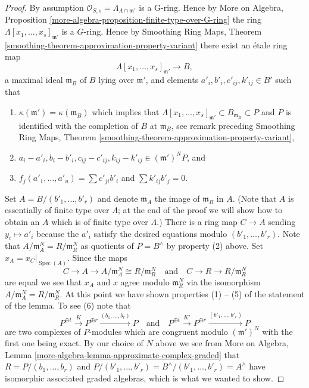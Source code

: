 \documentclass{stacks-project}
\theoremstyle{plain}
\theoremstyle{definition}
\theoremstyle{remark}
\numberwithin{equation}{subsection}
\def\Spec{\mathop{\mathrm{Spec}}}
\begin{document}
\begin{proof}
\medskip\noindent
By assumption $\mathcal{O}_{S, s} = \Lambda_{\Lambda \cap \mathfrak m'}$ is
a G-ring. Hence by More on Algebra, Proposition
\ref{more-algebra-proposition-finite-type-over-G-ring}
the ring $\Lambda[x_1, \ldots, x_s]_{\mathfrak m'}$ is a $G$-ring.
Hence by Smoothing Ring Maps, Theorem
\ref{smoothing-theorem-approximation-property-variant}
there exist an \'etale ring map
$$
\Lambda[x_1, \ldots, x_s]_{\mathfrak m'} \to B,
$$
a maximal ideal $\mathfrak m_B$ of $B$ lying over $\mathfrak m'$, and
elements $a'_i, b'_i, c'_{ij}, k'_{ij} \in B'$ such that
\begin{enumerate}
\item $\kappa(\mathfrak m') = \kappa(\mathfrak m_B)$ which implies
that $\Lambda[x_1, \ldots, x_s]_{\mathfrak m'} \subset B_{\mathfrak m_B}
\subset P$ and $P$ is identified with the completion of $B$ at
$\mathfrak m_B$, see remark preceding Smoothing Ring Maps, Theorem
\ref{smoothing-theorem-approximation-property-variant},
\item $a_i - a'_i, b_i - b'_i, c_{ij} - c'_{ij}, k_{ij} - k'_{ij} \in
(\mathfrak m')^N P$, and
\item $f_j(a'_1, \ldots, a'_u) = \sum c'_{ji} b'_i$ and $\sum k'_{ij}b'_j = 0$.
\end{enumerate}
Set $A = B/(b'_1, \ldots, b'_r)$ and denote $\mathfrak m_A$ the
image of $\mathfrak m_B$ in $A$. (Note that $A$ is essentially of finite
type over $\Lambda$; at the end of the proof we will show how to obtain
an $A$ which is of finite type over $\Lambda$.) There is a ring map
$C \to A$ sending $y_i \mapsto a'_i$ because the $a'_i$ satisfy
the desired equations modulo $(b'_1, \ldots, b'_r)$.
Note that $A/\mathfrak m_A^N = R/\mathfrak m_R^N$ as quotients of
$P = B^\wedge$ by property (2) above. Set $x_A = x_C|_{\Spec(A)}$.
Since the maps
$$
C \to A \to A/\mathfrak m_A^N \cong R/\mathfrak m_R^N
\quad\text{and}\quad
C \to R \to R/\mathfrak m_R^N
$$
are equal we see that $x_A$ and $x$ agree modulo $\mathfrak m_R^N$
via the isomorphism $A/\mathfrak m_A^N = R/\mathfrak m_R^N$. At this
point we have shown properties (1) -- (5) of the statement of the lemma.
To see (6) note that
$$
P^{\oplus t} \xrightarrow{K}
P^{\oplus r} \xrightarrow{(b_1, \ldots, b_r)}
P
\quad\text{and}\quad
P^{\oplus t} \xrightarrow{K'}
P^{\oplus r} \xrightarrow{(b'_1, \ldots, b'_r)}
P
$$
are two complexes of $P$-modules which are congruent modulo
$(\mathfrak m')^N$ with the first one being exact. By our choice of $N$
above we see from
More on Algebra, Lemma \ref{more-algebra-lemma-approximate-complex-graded}
that $R = P/(b_1, \ldots, b_r)$ and
$P/(b'_1, \ldots, b'_r) = B^\wedge/(b'_1, \ldots, b'_r) = A^\wedge$
have isomorphic associated graded algebras, which is what we wanted to show.


\end{proof}
\end{document}
